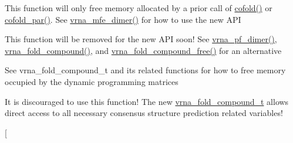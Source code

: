 \begin{DoxyRefList}
\item[\label{deprecated__deprecated000032}%
\hypertarget{deprecated__deprecated000032}{}%
global\+Scope$>$ Global \hyperlink{group__mfe__cofold_gaafb33d7473eb9af9d1b168ca8761c41a}{free\+\_\+co\+\_\+arrays} (void)]This function will only free memory allocated by a prior call of \hyperlink{group__mfe__cofold_gabc8517f22cfe70595ee81fc837910d52}{cofold()} or \hyperlink{group__mfe__cofold_ga7612cfeeb1b793f1e4179b1eb53df1f3}{cofold\+\_\+par()}. See \hyperlink{group__mfe__cofold_gaab22d10c1190f205f16a77cab9d5d3ee}{vrna\+\_\+mfe\+\_\+dimer()} for how to use the new A\+P\+I 
\item[\label{deprecated__deprecated000116}%
\hypertarget{deprecated__deprecated000116}{}%
global\+Scope$>$ Global \hyperlink{part__func__co_8h_ade3ce34ae8214811374b1d28a40dc247}{free\+\_\+co\+\_\+pf\+\_\+arrays} (void)]This function will be removed for the new A\+P\+I soon! See \hyperlink{group__pf__cofold_ga4e5c7d06c302a7c59fc0d64dc142ca63}{vrna\+\_\+pf\+\_\+dimer()}, \hyperlink{group__fold__compound_ga6601d994ba32b11511b36f68b08403be}{vrna\+\_\+fold\+\_\+compound()}, and \hyperlink{group__fold__compound_gadded6039d63f5d6509836e20321534ad}{vrna\+\_\+fold\+\_\+compound\+\_\+free()} for an alternative  
\item[\label{deprecated__deprecated000097}%
\hypertarget{deprecated__deprecated000097}{}%
global\+Scope$>$ Global \hyperlink{group__pf__fold_gae73db3f49a94f0f72e067ecd12681dbd}{free\+\_\+pf\+\_\+arrays} (void)]See vrna\+\_\+fold\+\_\+compound\+\_\+t and its related functions for how to free memory occupied by the dynamic programming matrices 
\item[\label{deprecated__deprecated000024}%
\hypertarget{deprecated__deprecated000024}{}%
global\+Scope$>$ Global \hyperlink{group__consensus__fold_ga5349960075b1847720a2e9df021e2675}{get\+\_\+alipf\+\_\+arrays} (short $\ast$$\ast$$\ast$\+S\+\_\+p, short $\ast$$\ast$$\ast$\+S5\+\_\+p, short $\ast$$\ast$$\ast$\+S3\+\_\+p, unsigned short $\ast$$\ast$$\ast$a2s\+\_\+p, char $\ast$$\ast$$\ast$\+Ss\+\_\+p, F\+L\+T\+\_\+\+O\+R\+\_\+\+D\+B\+L $\ast$$\ast$qb\+\_\+p, F\+L\+T\+\_\+\+O\+R\+\_\+\+D\+B\+L $\ast$$\ast$qm\+\_\+p, F\+L\+T\+\_\+\+O\+R\+\_\+\+D\+B\+L $\ast$$\ast$q1k\+\_\+p, F\+L\+T\+\_\+\+O\+R\+\_\+\+D\+B\+L $\ast$$\ast$qln\+\_\+p, short $\ast$$\ast$pscore)]It is discouraged to use this function! The new \hyperlink{group__fold__compound_ga1b0cef17fd40466cef5968eaeeff6166}{vrna\+\_\+fold\+\_\+compound\+\_\+t} allows direct access to all necessary consensus structure prediction related variables! 
\item[\label{deprecated__deprecated000087}%
$$
\end{DoxyRefList}
